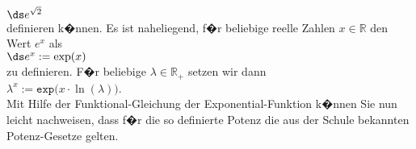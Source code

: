 $\ds e^{\sqrt{2}}$
\\[0.2cm]
definieren k�nnen.  Es ist naheliegend, f�r beliebige reelle Zahlen $x \in \mathbb{R}$ den
Wert $e^x$ als
\\[0.2cm]
\hspace*{1.3cm}
$\ds e^x := \exp(x)$
\\[0.2cm]
zu definieren.  F�r beliebige $\lambda \in \mathbb{R}_+$ setzen wir dann
\\[0.2cm]
\hspace*{1.3cm}
$\lambda^x := \mathtt{exp}\bigl(x \cdot \ln(\lambda) \bigr)$.
\\[0.2cm]
Mit Hilfe der Funktional-Gleichung der Exponential-Funktion k�nnen Sie nun leicht nachweisen, dass
f�r die so definierte Potenz die aus der Schule bekannten Potenz-Gesetze gelten. \eox

